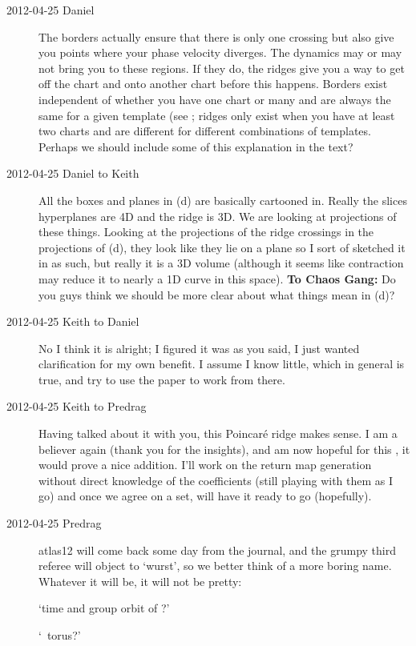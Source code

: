 \begin{description}
\item[2012-04-25 Daniel] The borders actually ensure that there is only one crossing but also give you points where your phase velocity diverges. The dynamics may or may not bring you to these regions. If they do, the ridges give you a way to get off the chart and onto another chart before this happens. Borders exist independent of whether you have one chart or many and are always the same for a given template (see ; ridges only exist when you have at least two charts and are different for different combinations of templates. Perhaps we should include some of this explanation in the text?

\item[2012-04-25 Daniel to Keith] All the boxes and planes in (d) are basically cartooned in. Really the slices hyperplanes are 4D and the ridge is 3D. We are looking at projections of these things. Looking at the projections of the ridge crossings in the projections of (d), they look like they lie on a plane so I sort of sketched it in as such, but really it is a 3D volume (although it seems like contraction may reduce it to nearly a 1D curve in this space). {\bf To Chaos Gang:} Do you guys think we should be more clear about what things mean in (d)?

\item[2012-04-25 Keith to Daniel]  No I think it is alright; I figured it was as you said, I just wanted clarification for my own benefit.  I assume I know little, which in general is true, and try to use the paper to work from there.

\item[2012-04-25 Keith to Predrag]  Having talked about it with you, this
Poincar\'e ridge makes sense.  I am a believer again (thank you for the
insights), and am now hopeful for this {\twoMode}, it would prove a nice
addition.  I'll work on the return map generation without direct
knowledge of the coefficients (still playing with them as I go) and once
we agree on a set, will have it ready to go (hopefully).

\item[2012-04-25 Predrag] atlas12 will come back some day from the
journal, and the grumpy third referee will object to `wurst', so we
better think of a more boring name. Whatever it will be, it will not be
pretty:

`time and group orbit of \ssp?'

`\rpo\ torus?'


\end{description}
